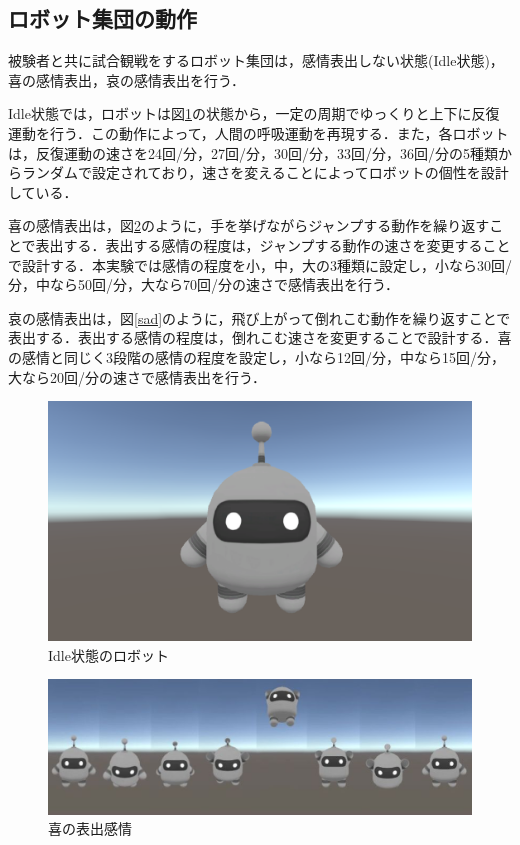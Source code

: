 \newpage



\subsection{ロボット集団の動作}
\label{sec3.2.2}

被験者と共に試合観戦をするロボット集団は，感情表出しない状態(Idle状態)，喜の感情表出，哀の感情表出を行う．

Idle状態では，ロボットは図\ref{Idle}の状態から，一定の周期でゆっくりと上下に反復運動を行う．この動作によって，人間の呼吸運動を再現する．また，各ロボットは，反復運動の速さを24回/分，27回/分，30回/分，33回/分，36回/分の5種類からランダムで設定されており，速さを変えることによってロボットの個性を設計している．

喜の感情表出は，図\ref{happy}のように，手を挙げながらジャンプする動作を繰り返すことで表出する．表出する感情の程度は，ジャンプする動作の速さを変更することで設計する．本実験では感情の程度を小，中，大の3種類に設定し，小なら30回/分，中なら50回/分，大なら70回/分の速さで感情表出を行う．

哀の感情表出は，図\ref{sad}のように，飛び上がって倒れこむ動作を繰り返すことで表出する．表出する感情の程度は，倒れこむ速さを変更することで設計する．喜の感情と同じく3段階の感情の程度を設定し，小なら12回/分，中なら15回/分，大なら20回/分の速さで感情表出を行う．


\vspace{1cm}
 \begin{figure}[!h]
 \begin{center}
  \centering
  \includegraphics[width=12cm]{images/chapter3/Idle.eps}
  \caption{Idle状態のロボット}
  \label{Idle}
 \end{center}
\end{figure}

\vspace{1cm}
 \begin{figure}[!h]
 \begin{center}
  \centering
  \includegraphics[width=12cm]{images/chapter3/happy.eps}
  \caption{喜の表出感情}
  \label{happy}
 \end{center}
\end{figure}

